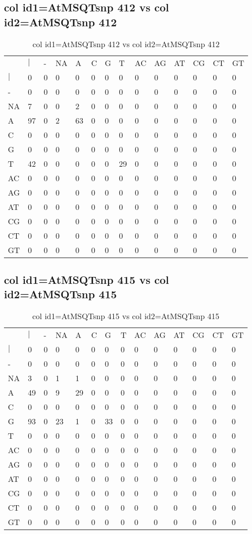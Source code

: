 \subsection{col id1=AtMSQTsnp 412 vs col id2=AtMSQTsnp 412}
\begin{center}
\begin{longtable}{|l|l|l|l|l|l|l|l|l|l|l|l|l|l|}
\caption{col id1=AtMSQTsnp 412 vs col id2=AtMSQTsnp 412} \label{table_dm730}\\
\hline
\\
\hline
&$|$&-&NA&A&C&G&T&AC&AG&AT&CG&CT&GT\\
$|$&0&0&0&0&0&0&0&0&0&0&0&0&0\\
-&0&0&0&0&0&0&0&0&0&0&0&0&0\\
NA&7&0&0&2&0&0&0&0&0&0&0&0&0\\
A&97&0&2&63&0&0&0&0&0&0&0&0&0\\
C&0&0&0&0&0&0&0&0&0&0&0&0&0\\
G&0&0&0&0&0&0&0&0&0&0&0&0&0\\
T&42&0&0&0&0&0&29&0&0&0&0&0&0\\
AC&0&0&0&0&0&0&0&0&0&0&0&0&0\\
AG&0&0&0&0&0&0&0&0&0&0&0&0&0\\
AT&0&0&0&0&0&0&0&0&0&0&0&0&0\\
CG&0&0&0&0&0&0&0&0&0&0&0&0&0\\
CT&0&0&0&0&0&0&0&0&0&0&0&0&0\\
GT&0&0&0&0&0&0&0&0&0&0&0&0&0\\
\hline
\end{longtable}
\end{center}

\subsection{col id1=AtMSQTsnp 415 vs col id2=AtMSQTsnp 415}
\begin{center}
\begin{longtable}{|l|l|l|l|l|l|l|l|l|l|l|l|l|l|}
\caption{col id1=AtMSQTsnp 415 vs col id2=AtMSQTsnp 415} \label{table_dm732}\\
\hline
\\
\hline
&$|$&-&NA&A&C&G&T&AC&AG&AT&CG&CT&GT\\
$|$&0&0&0&0&0&0&0&0&0&0&0&0&0\\
-&0&0&0&0&0&0&0&0&0&0&0&0&0\\
NA&3&0&1&1&0&0&0&0&0&0&0&0&0\\
A&49&0&9&29&0&0&0&0&0&0&0&0&0\\
C&0&0&0&0&0&0&0&0&0&0&0&0&0\\
G&93&0&23&1&0&33&0&0&0&0&0&0&0\\
T&0&0&0&0&0&0&0&0&0&0&0&0&0\\
AC&0&0&0&0&0&0&0&0&0&0&0&0&0\\
AG&0&0&0&0&0&0&0&0&0&0&0&0&0\\
AT&0&0&0&0&0&0&0&0&0&0&0&0&0\\
CG&0&0&0&0&0&0&0&0&0&0&0&0&0\\
CT&0&0&0&0&0&0&0&0&0&0&0&0&0\\
GT&0&0&0&0&0&0&0&0&0&0&0&0&0\\
\hline
\end{longtable}
\end{center}

